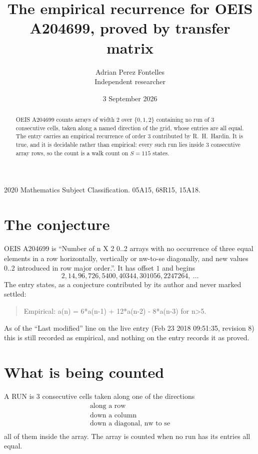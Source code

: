 \documentclass[11pt,a4paper]{article}
\title{The empirical recurrence for OEIS A204699, proved by transfer matrix}
\author{Adrian Perez Fontelles\\ \small Independent researcher}
\date{3 September 2026}
\theoremstyle{plain}
\theoremstyle{definition}
\begin{document}
\maketitle

\begin{abstract}
OEIS A204699 counts arrays of width $2$ over $\{0,1,2\}$ containing no run of $3$ consecutive
cells, taken along a named direction of the grid, whose entries are all equal. The entry carries
an empirical recurrence of order $3$ contributed by R.~H.~Hardin. It is true, and it is
decidable rather than empirical: every such run lies inside $3$ consecutive array rows, so
the count is a walk count on $S=115$ states.
\end{abstract}

\noindent\small 2020 Mathematics Subject Classification. 05A15, 68R15, 15A18.\normalsize

\section{The conjecture}

OEIS A204699 is ``Number of n X 2 0..2 arrays with no occurrence of three equal elements in a row horizontally, vertically or nw-to-se diagonally, and new values 0..2 introduced in row major order.''. It has offset $1$ and begins
\[
2, 14, 96, 726, 5400, 40344, 301056, 2247264,\ \dots
\]
The entry states, as a conjecture contributed by its author and never marked settled:
\begin{quote}
Empirical: a(n) = 6*a(n-1) + 12*a(n-2) - 8*a(n-3) for n>5.
\end{quote}
As of the ``Last modified'' line on the live entry (Feb 23 2018 09:51:35, revision 8) this is still
recorded as empirical, and nothing on the entry records it as proved.

\section{What is being counted}

A RUN is $3$ consecutive cells taken along one of the directions
\[
\begin{array}{l}
\text{along a row} \\
\text{down a column} \\
\text{down a diagonal, nw to se} \\
\end{array}
\]
all of them inside the array. The array is counted when no run has its entries all equal.
\end{document}
